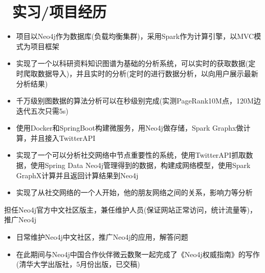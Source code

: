 \documentclass{resume}
\begin{document}
\section{\faUsers\ 实习/项目经历}
\vspace{-0.7em}
\begin{onehalfspacing}
\begin{itemize}
  \item 项目以Neo4j作为数据库(负载均衡集群)，采用Spark作为计算引擎，以MVC模式为项目框架
  \item 实现了一个以科研资料知识图谱为基础的分析系统，可以实时的获取数据(定时爬取数据导入)，并且实时的分析(定时的进行数据分析，以向用户展示最新分析结果)
  \item 千万级别图数据的算法分析可以在秒级别完成(实测PageRank10M点，120M边迭代五次只需5s)
\end{itemize}
\end{onehalfspacing}
\vspace{-0.7em}
\begin{onehalfspacing}
\begin{itemize}
  \item 使用Docker和SpringBoot构建微服务，用Neo4j做存储，Spark Graphx做计算，并且接入TwitterAPI
  \item 实现了一个可以分析社交网络中节点重要性的系统，使用TwitterAPI抓取数据，使用Spring Data Neo4j管理得到的数据，构建成网络模型，使用Spark GraphX计算并且返回计算结果到Neo4j
  \item 实现了从社交网络的一个人开始，他的朋友网络之间的关系，影响力等分析
\end{itemize}
\end{onehalfspacing}

担任Neo4j官方中文社区版主，兼任维护人员(保证网站正常访问，统计流量等)，推广Neo4j
\begin{onehalfspacing}
\begin{itemize}
  \item 日常维护Neo4j中文社区，推广Neo4j的应用，解答问题
  \item 在此期间与Neo4j中国合作伙伴微云数聚一起完成了《Neo4j权威指南》的写作(清华大学出版社，5月份出版，已交稿)
\end{itemize}
\end{onehalfspacing}
\end{document}
